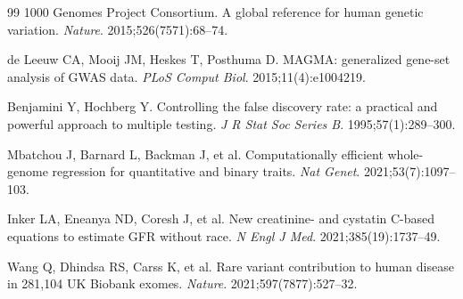 \documentclass[11pt,a4paper]{article}
\begin{document}
\begin{thebibliography}{99}
 1000 Genomes Project Consortium. A global reference for human genetic
variation. \textit{Nature}. 2015;526(7571):68--74.

 de Leeuw CA, Mooij JM, Heskes T, Posthuma D. MAGMA: generalized
gene-set analysis of GWAS data. \textit{PLoS Comput Biol}. 2015;11(4):e1004219.

 Benjamini Y, Hochberg Y. Controlling the false discovery rate: a
practical and powerful approach to multiple testing.
\textit{J R Stat Soc Series B}. 1995;57(1):289--300.

 Mbatchou J, Barnard L, Backman J, et al. Computationally efficient
whole-genome regression for quantitative and binary traits.
\textit{Nat Genet}. 2021;53(7):1097--103.

 Inker LA, Eneanya ND, Coresh J, et al. New creatinine- and cystatin
C-based equations to estimate GFR without race.
\textit{N Engl J Med}. 2021;385(19):1737--49.

 Wang Q, Dhindsa RS, Carss K, et al. Rare variant contribution to human
disease in 281,104 UK Biobank exomes. \textit{Nature}. 2021;597(7877):527--32.

\end{thebibliography}
\end{document}
